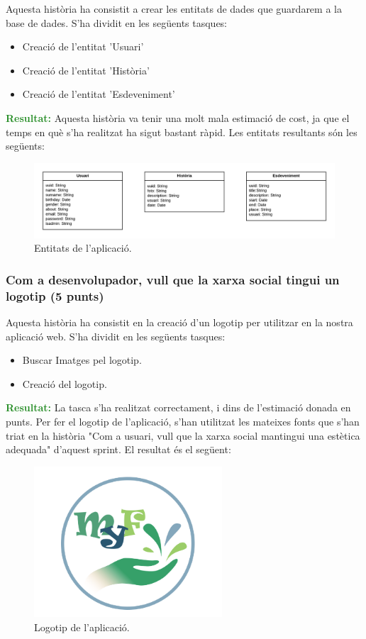 \documentclass[11pt,catalan,listoffigures,listoftables]{tfgetsinf}
\begin{document}
Aquesta història ha consistit a crear les entitats de dades que guardarem a la base de dades. S'ha dividit en les següents tasques:
\begin{itemize}
\item Creació de l'entitat 'Usuari'
\item Creació de l'entitat 'Història'
\item Creació de l'entitat 'Esdeveniment'
\end{itemize}
\textcolor{forestgreen}{\textbf{Resultat:}} Aquesta història va tenir una molt mala estimació de cost, ja que el temps en què s'ha realitzat ha sigut bastant ràpid. Les entitats resultants són les següents:

\begin{figure}[h]
\includegraphics[width=15cm]{images/image6}
\centering
\caption[]{Entitats de l'aplicació.}
\centering
\end{figure}

\subsubsection{Com a desenvolupador, vull que la xarxa social tingui un logotip (5 punts)}

Aquesta història ha consistit en la creació d'un logotip per utilitzar en la nostra aplicació web. S'ha dividit en les següents tasques:
\begin{itemize}
\item Buscar Imatges pel logotip.
\item Creació del logotip.
\end{itemize}
\textcolor{forestgreen}{\textbf{Resultat:}} La tasca s'ha realitzat correctament, i dins de l'estimació donada en punts. Per fer el logotip de l'aplicació, s'han utilitzat les mateixes fonts que s'han triat en la història "Com a usuari, vull que la xarxa social mantingui una estètica adequada" d'aquest sprint.
El resultat és el següent:

\begin{figure}[H]
\includegraphics[width=7cm]{images/image3}
\centering
\caption[]{Logotip de l'aplicació.}
\centering
\end{figure}
\end{document}
